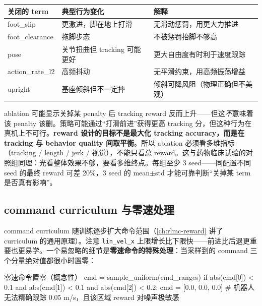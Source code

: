 \begin{center}
\small
\begin{tabular}{@{}lll@{}}
\toprule
关闭的 term & 典型行为变化 & 解释 \\
\midrule
foot\_slip & 更激进，脚在地上打滑 & 无滑动惩罚，用更大力推进 \\
foot\_clearance & 拖脚步态 & 不被惩罚抬脚不够高 \\
pose & 关节扭曲但 tracking 可能更好 & 更大自由度有时利于速度跟踪 \\
action\_rate\_l2 & 高频抖动 & 无平滑约束，用高频振荡增益 \\
upright & 基座倾斜但不一定摔 & 倾斜可降风阻（物理正确但不美观） \\
\bottomrule
\end{tabular}
\end{center}

\begin{insight}\label{ins:rlmc-ql-ablation}
ablation 可能显示关掉某 penalty 后 tracking reward 反而上升——但这\emph{不}意味着该 penalty 该删。策略可能通过“打滑前进”获得更高 tracking 分，但这种行为在真机上不可行。\textbf{reward 设计的目标不是最大化 tracking accuracy，而是在 tracking 与 behavior quality 间取平衡}。所以 ablation 必须看多维指标（tracking / length / jerk / 视觉），不能只看总 reward。这与药物临床试验的对照组同理：光看整体效果不够，要看多维终点。每组至少 3 seed——同配置不同 seed 的最终 reward 可差 20\%，3 seed 的 mean$\pm$std 才能可靠判断“关掉某 term 是否真有影响”。
\end{insight}

\subsection{command curriculum 与零速处理}
\label{sec:rlmc-ql-train-cmdcurr}

command curriculum 随训练逐步扩大命令范围（\cref{ch:rlmc-reward} 讲了 curriculum 的通用原理）。注意 \verb|lin_vel_x| 上限增长比下限快——前进比后退更重要也更易学。一个易忽略的细节是\textbf{零速命令的特殊处理}：当采样到的 command 三个分量绝对值都很小时置零：

\begin{codebox}[Python]{零速命令置零（概念性）}
cmd = sample_uniform(cmd_ranges)
if abs(cmd[0]) < 0.1 and abs(cmd[1]) < 0.1 and abs(cmd[2]) < 0.2:
    cmd = [0.0, 0.0, 0.0]      # 机器人无法精确跟踪 0.05 m/s，且该区域 reward 对噪声极敏感
\end{codebox}

